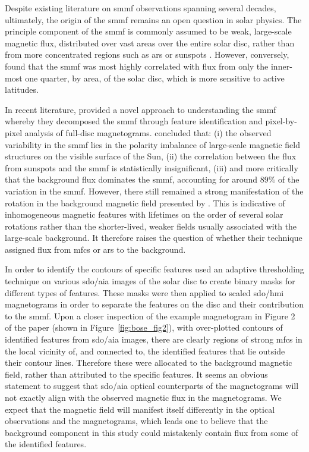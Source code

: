 Despite existing literature on \gls{smmf} observations spanning several decades, ultimately, the origin of the \gls{smmf} remains an open question in solar physics. The principle component of the \gls{smmf} is commonly assumed to be weak, large-scale magnetic flux, distributed over vast areas over the entire solar disc, rather than from more concentrated regions such as \glspl{ar} or sunspots \citep{severny_time_1971, scherrer_mean_1977, xiang_ensemble_2016}. However, conversely, \citet{scherrer_mean_1972} found that the \gls{smmf} was most highly correlated with flux from only the inner-most one quarter, by area, of the solar disc, which is more sensitive to active latitudes.

In recent literature, \citet{bose_variability_2018} provided a novel approach to understanding the \gls{smmf} whereby they decomposed the \gls{smmf} through feature identification and pixel-by-pixel analysis of full-disc magnetograms. \citet{bose_variability_2018} concluded that: (i) the observed variability in the \gls{smmf} lies in the polarity imbalance of large-scale magnetic field structures on the visible surface of the Sun, (ii) the correlation between the flux from sunspots and the \gls{smmf} is statistically insignificant, (iii) and more critically that the background flux dominates the \gls{smmf}, accounting for around $89 \%$ of the variation in the \gls{smmf}. However, there still remained a strong manifestation of the rotation in the background magnetic field presented by \citet{bose_variability_2018}. This is indicative of inhomogeneous magnetic features with lifetimes on the order of several solar rotations rather than the shorter-lived, weaker fields usually associated with the large-scale background. It therefore raises the question of whether their technique assigned flux from \glspl{mfc} or \glspl{ar} to the background.

In order to identify the contours of specific features \citet{bose_variability_2018} used an adaptive thresholding technique on various \gls{sdo/aia} images of the solar disc to create binary masks for different types of features. These masks were then applied to scaled \gls{sdo/hmi} magnetograms in order to separate the features on the disc and their contribution to the \gls{smmf}. Upon a closer inspection of the example magnetogram in Figure 2 of the paper (shown in Figure~\ref{fig:bose_fig2}), with over-plotted contours of identified features from \gls{sdo/aia} images, there are clearly regions of strong \glspl{mfc} in the local vicinity of, and connected to, the identified features that lie outside their contour lines. Therefore these were allocated to the background magnetic field, rather than attributed to the specific features. It seems an obvious statement to suggest that \gls{sdo/aia} optical counterparts of the magnetograms will not exactly align with the observed magnetic flux in the magnetograms. We expect that the magnetic field will manifest itself differently in the optical observations and the magnetograms, which leads one to believe that the background component in this study could mistakenly contain flux from some of the identified features.


